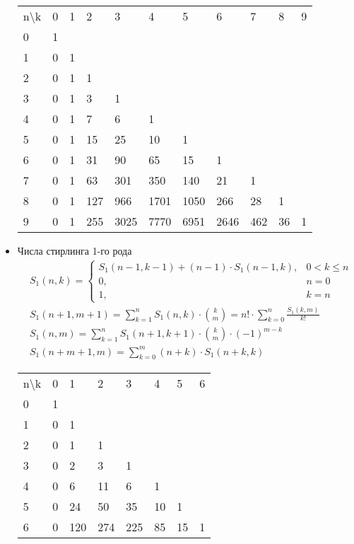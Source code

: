 \documentclass{article}
\begin{document}
\begin{itemize}
\begin{longtable}[c]{lllllllllll}
n\textbackslash{}k & 0 & 1 & 2 & 3 & 4 & 5 & 6 & 7 & 8 & 9
\\
0 & 1 & & & & & & & & &
\\
1 & 0 & 1 & & & & & & & &
\\
2 & 0 & 1 & 1 & & & & & & &
\\
3 & 0 & 1 & 3 & 1 & & & & & &
\\
4 & 0 & 1 & 7 & 6 & 1 & & & & &
\\
5 & 0 & 1 & 15 & 25 & 10 & 1 & & & &
\\
6 & 0 & 1 & 31 & 90 & 65 & 15 & 1 & & &
\\
7 & 0 & 1 & 63 & 301 & 350 & 140 & 21 & 1 & &
\\
8 & 0 & 1 & 127 & 966 & 1701 & 1050 & 266 & 28 & 1 &
\\
9 & 0 & 1 & 255 & 3025 & 7770 & 6951 & 2646 & 462 & 36 & 1
\\

\end{longtable}
\item Числа стирлинга 1-го рода
\begin{equation}
  \begin{split}
    &S_1(n, k) = 
    \left\{
    \begin{array}{cc}
    S_1(n-1, k-1) + (n - 1) \cdot S_1(n-1, k), & 0 < k \le n\\
    0, & n = 0\\
    1, & k = n
    \end{array}
    \right.\\
    &S_1(n + 1, m + 1) = \sum\limits_{k = 1}^n S_1(n, k) \cdot \binom{k}{m} = n! \cdot \sum\limits_{k=0}^n\frac{S_1(k, m)}{k!}\\
    &S_1(n, m) = \sum\limits_{k=1}^n S_1(n + 1, k + 1) \cdot \binom{k}{m} \cdot (-1)^{m - k}\\
    &S_1(n + m + 1, m) = \sum\limits_{k=0}^m (n + k) \cdot S_1(n + k, k)
  \end{split}
\end{equation}
\begin{longtable}[c]{llllllll}

n\textbackslash{}k & 0 & 1 & 2 & 3 & 4 & 5 & 6
\\

0 & 1 & & & & & &
\\
1 & 0 & 1 & & & & &
\\
2 & 0 & 1 & 1 & & & &
\\
3 & 0 & 2 & 3 & 1 & & &
\\
4 & 0 & 6 & 11 & 6 & 1 & &
\\
5 & 0 & 24 & 50 & 35 & 10 & 1 &
\\
6 & 0 & 120 & 274 & 225 & 85 & 15 & 1
\\


\end{longtable}
\end{itemize}
\end{document}
